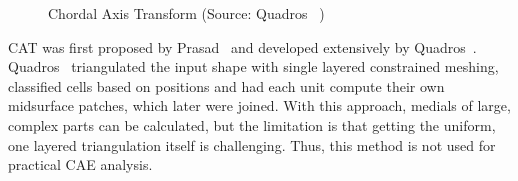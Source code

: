 	\begin{figure}[!h]
	\centering     %
	 \quad
	\caption{Chordal  Axis Transform (Source: Quadros~\cite{QuadrosRoshanOwenBrewerShimada2004} )} %
	\label{fig:litsurvey:cat}
	\end{figure}
	

CAT was first proposed by Prasad~\cite{Prasad2007} and developed extensively by Quadros~\cite{QuadrosShimadaOwen2004, QuadrosRoshanOwenBrewerShimada2004, Quadros2008}.
Quadros~\cite{QuadrosShimadaOwen2004, Quadros2008, Quadros2000} triangulated the input shape with single layered constrained meshing, classified cells based on positions and had each unit compute their own midsurface patches, which later were joined. With this approach, medials of large, complex parts can be calculated, but the limitation is that getting the uniform, one layered triangulation itself is challenging. Thus, this method is not used for practical CAE analysis.
	
